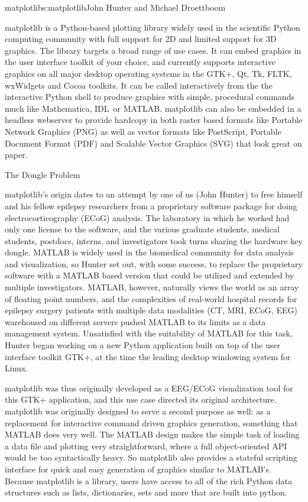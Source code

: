 \begin{aosachapter}{matplotlib}{s:matplotlib}{John Hunter and Michael Droettboom}

matplotlib is a Python-based plotting library widely used in
the scientific Python computing community with full support for 2D and
limited support for 3D graphics.  The library targets a broad range of
use cases.  It can embed graphics in the user interface toolkit of
your choice, and currently supports interactive graphics on all major
desktop operating systems in the GTK+, Qt, Tk, FLTK, wxWidgets and
Cocoa toolkits.  It can be called interactively from the the
interactive Python shell to produce graphics with simple, procedural
commands much like Mathematica\texttrademark, IDL\texttrademark\ or
MATLAB\texttrademark.  matplotlib can also be embedded in a headless
webserver to provide hardcopy in both raster based formats like
Portable Network Graphics (PNG) as well as vector formats like
PostScript, Portable Document Format (PDF) and Scalable Vector
Graphics (SVG) that look great on paper.

\begin{aosasect1}{The Dongle Problem}

matplotlib's origin dates to an attempt by one of us (John Hunter) to
free himself and his fellow epilepsy researchers from a proprietary
software package for doing electrocorticography (ECoG) analysis.  The
laboratory in which he worked had only one license to the software,
and the various graduate students, medical students, postdocs, interns,
and investigators took turns sharing the hardware key dongle.
MATLAB is widely used in the biomedical community for
data analysis and visualization, so Hunter set out, with some success,
to replace the proprietary software with a MATLAB based version that
could be utilized and extended by multiple investigators.  MATLAB,
however, naturally views the world as an array of floating point
numbers, and the complexities of real-world hospital records for
epilepsy surgery patients with multiple data modalities (CT, MRI,
ECoG, EEG) warehoused on different servers pushed MATLAB to its limits
as a data management system.  Unsatisfied with the suitability of
MATLAB for this task, Hunter began working on a new Python application
built on top of the user interface toolkit GTK+, at the time the
leading desktop windowing system for Linux.


matplotlib was thus originally developed as a EEG/ECoG visualization
tool for this GTK+ application, and this use case directed its
original architecture.  matplotlib was originally designed to serve a
second purpose as well: as a replacement for interactive command
driven graphics generation, something that MATLAB does very well.  The
MATLAB design makes the simple task of loading a data file and
plotting very straightforward, where a full object-oriented API would
be too syntactically heavy.  So matplotlib also provides a stateful
scripting interface for quick and easy generation of graphics similar
to MATLAB's.  Because matplotlib is a library, users have access to
all of the rich Python data structures such as lists, dictionaries,
sets and more that are built into python.


\end{aosasect1}
\end{aosachapter}

